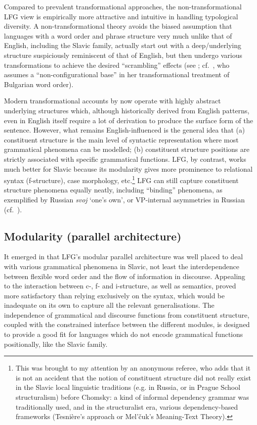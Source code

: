 \documentclass[output=paper,hidelinks]{langscibook}
\begin{document}
\hspace*{-2.4pt}Compared to prevalent transformational approaches, the non-transformational LFG view is empirically more attractive and intuitive in handling typological diversity. A non-transformational theory avoids the biased assumption that languages with a word order and phrase structure very much unlike that of English, including the Slavic family, actually start out with a deep/underlying structure suspiciously reminiscent of that of English, but then undergo various transformations to achieve the desired ``scrambling'' effects (see \citealt[6ff.]{BresnanEtAl2016}{;} cf.\ \citealt{Rudin1985}, who assumes a  ``non-configurational base'' in her transformational treatment of Bulgarian word order).

\largerpage
Modern transformational accounts by now operate with highly abstract underlying structures which, although historically derived from English patterns, even in English itself require a lot of derivation to produce the surface form of the sentence. However, what remains English-influenced is the general idea that (a) constituent structure is the main level of syntactic representation where most grammatical phenomena can be modelled; (b) constituent structure positions are strictly associated with specific grammatical functions. LFG, by contrast, works much better for Slavic because its modularity gives more prominence to relational syntax (f-structure), case morphology, etc.\footnote{This was brought to my attention by an anonymous referee, who adds that it is not an accident that the notion of constituent structure did not really exist in the Slavic local linguistic traditions (e.g. in Russia, or in Prague School structuralism) before Chomsky: a kind of informal dependency grammar was traditionally used, and in the structuralist era, various dependency-based frameworks (Tesnière's approach or Mel'čuk's Meaning-Text Theory).} LFG can still capture constituent structure phenomena equally neatly, including ``binding'' phenomena, as exemplified by Russian \textit{svoj} `one's own', or VP-internal asymmetries in Russian (cf.\ \citealt[140--151]{Bailyn2011}).

\subsection{Modularity (parallel architecture)}
\label{sec:Slavic:3.2}

It emerged in  that LFG's modular parallel architecture was well placed to deal with various grammatical phenomena in Slavic, not least the interdependence between flexible word order and the flow of information in discourse. Appealing to the interaction between c-, f- and i-structure, as well as semantics, proved more satisfactory than relying exclusively on the syntax, which would be inadequate on its own to capture all the relevant generalisations. The independence of grammatical and discourse functions from constituent structure, coupled with the constrained interface between the different modules, is designed to provide a good fit for languages which do not encode grammatical functions positionally, like the Slavic family.
\end{document}

